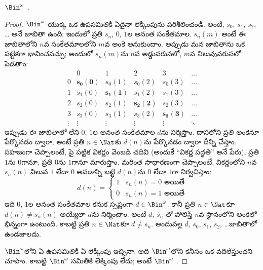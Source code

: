 \documentclass[../../../include/open-logic-section]{subfiles}
\begin{document}
\begin{thm}
$\Bin^\omega$~.
\end{thm}

\begin{proof}
$\Bin^\omega$ యొక్క ఒక ఉపసమితికి ఏదైనా లెక్కింపును పరిశీలించండి.
అంటే, $s_{0}$, $s_{1}$, $s_{2}$, \dots{} అనే జాబితా ఉంది; ఇందులో
ప్రతి $s_n$, $0$, $1$ల అనంత సంకేతమాల. $s_n(m)$ అంటే ఈ జాబితాలోని
$n$వ సంకేతమాలలోని $m$వ అంకె అనుకుందాం. అప్పుడు మన జాబితాను ఒక
పట్టికగా భావించవచ్చు; అందులో $s_n(m)$ను $n$వ అడ్డువరుసలో, $m$వ
నిలువువరుసలో పెడతాం:
\[
\begin{array}{c|c|c|c|c|c}
& 0 & 1 & 2 & 3 & \dots \\\hline
0 & \mathbf{s_{0}(0)} & s_{0}(1) & s_{0}(2) & s_0(3) & \dots \\\hline
1 & s_{1}(0)& \mathbf{s_{1}(1)} & s_1(2) & s_1(3) & \dots \\\hline
2 & s_{2}(0)& s_{2}(1) & \mathbf{s_2(2)} & s_2(3) & \dots \\\hline
3 & s_{3}(0)& s_{3}(1) & s_3(2) & \mathbf{s_3(3)} & \dots \\\hline
\vdots & \vdots & \vdots & \vdots & \vdots & \mathbf{\ddots}
\end{array}
\]
ఇప్పుడు ఈ జాబితాలో లేని $0$, $1$ల అనంత సంకేతమాల $d$ను నిర్మిస్తాం.
దానిలోని ప్రతి అంకెనూ పేర్కొనడం ద్వారా, అంటే ప్రతి $n \in \Nat$కు
$d(n)$ను పేర్కొనడం ద్వారా దీన్ని చేస్తాం. సహజంగా చెప్పాలంటే, పై
పట్టిక వికర్ణం వెంబడి చదివి (అందుకే ``వికర్ణ పద్ధతి'' అనే పేరు),
ప్రతి $1$ను $0$గానూ, ప్రతి $0$ను $1$గానూ మారుస్తాం.
మరింత సాధారణంగా చెప్పాలంటే, వికర్ణంలోని $n$వ  $s_n(n)$ విలువ $1$
లేదా $0$ అవడాన్ని బట్టి $d(n)$ను $0$ లేదా $1$గా నిర్వచిస్తాం:
\[
d(n) =
\begin{cases}
1 & \text{$s_{n}(n) = 0$ అయితే}\\
0 & \text{$s_{n}(n) = 1$ అయితే}
\end{cases}
\]
ఇది $0$, $1$ల అనంత సంకేతమాల కనుక స్పష్టంగా $d \in \Bin^\omega$.
కానీ ప్రతి $n \in \Nat$కూ $d(n) \neq s_n(n)$ అయ్యేలా $d$ను
నిర్మించాం. అంటే $d$, $s_n$ తో పోలిస్తే $n$వ స్థానంలోని అంకెలో భిన్నంగా ఉంటుంది.
కాబట్టి ప్రతి $n\in \Nat$కూ $d \neq s_n$. అందువల్ల $d$, $s_0$,
$s_1$, $s_2$, \dots జాబితాలో ఉండజాలదు.

$\Bin^\omega$లోని ఏ ఉపసమితికి ఏ లెక్కింపు ఇచ్చినా,
అది $\Bin^\omega$లోని కనీసం ఒక  వదిలేస్తుందని చూపాం.
కాబట్టి $\Bin^\omega$ సమితికి లెక్కింపు లేదు; అంటే $\Bin^\omega$
.
\end{proof}
\end{document}
